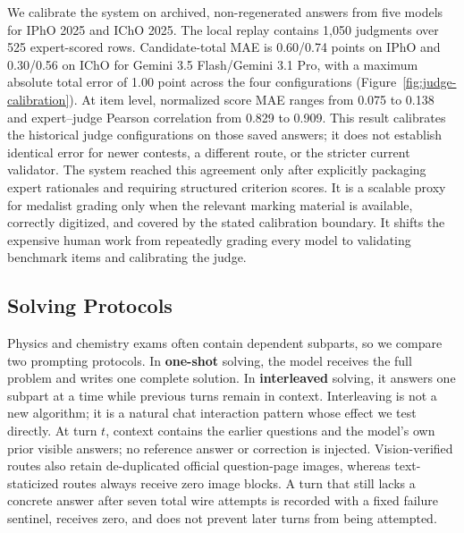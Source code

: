 \documentclass[11pt]{article}
\begin{document}
We calibrate the system on archived, non-regenerated answers from five models for IPhO 2025 and IChO 2025.
The local replay contains 1,050 judgments over 525 expert-scored rows. Candidate-total MAE is 0.60/0.74 points on IPhO and 0.30/0.56 on IChO for Gemini 3.5 Flash/Gemini 3.1 Pro, with a maximum absolute total error of 1.00 point across the four configurations (Figure~\ref{fig:judge-calibration}). At item level, normalized score MAE ranges from 0.075 to 0.138 and expert--judge Pearson correlation from 0.829 to 0.909.
This result calibrates the historical judge configurations on those saved answers; it does not establish identical error for newer contests, a different route, or the stricter current validator.
The system reached this agreement only after explicitly packaging expert rationales and requiring structured criterion scores. It is a scalable proxy for medalist grading only when the relevant marking material is available, correctly digitized, and covered by the stated calibration boundary.
It shifts the expensive human work from repeatedly grading every model to validating benchmark items and calibrating the judge.







\subsection{Solving Protocols}
\label{sec:solving-protocols}
Physics and chemistry exams often contain dependent subparts, so we compare two prompting protocols.
In \textbf{one-shot} solving, the model receives the full problem and writes one complete solution.
In \textbf{interleaved} solving, it answers one subpart at a time while previous turns remain in context.
Interleaving is not a new algorithm; it is a natural chat interaction pattern whose effect we test directly.
At turn $t$, context contains the earlier questions and the model's own prior visible answers; no reference answer or correction is injected.
Vision-verified routes also retain de-duplicated official question-page images, whereas text-staticized routes always receive zero image blocks.
A turn that still lacks a concrete answer after seven total wire attempts is recorded with a fixed failure sentinel, receives zero, and does not prevent later turns from being attempted.
\end{document}
